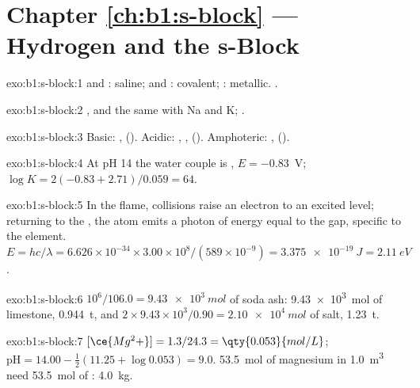 \section*{Chapter \ref{ch:b1:s-block} --- Hydrogen and the s-Block}

\begin{solution}{exo:b1:s-block:1}
 and : saline;  and : covalent;
: metallic. .
\end{solution}

\begin{solution}{exo:b1:s-block:2}
, and the same with Na and K;
.
\end{solution}

\begin{solution}{exo:b1:s-block:3}
Basic: ,  (). Acidic:
, ,  (). Amphoteric:
,  ().
\end{solution}

\begin{solution}{exo:b1:s-block:4}
At pH 14 the water couple is , $E = -0.83$~V;
$\log K = 2(-0.83 + 2.71)/0.059 = 64$.
\end{solution}

\begin{solution}{exo:b1:s-block:5}
In the flame, collisions raise an electron to an excited level; returning
to the , the atom emits a photon of energy equal to the gap,
specific to the element. $E = hc/\lambda = 6.626 \times 10^{-34} \times
3.00 \times 10^8/(589 \times 10^{-9}) = \qty{3.375e-19}{J} = \qty{2.11}{eV}$.
\end{solution}

\begin{solution}{exo:b1:s-block:6}
$10^6/106.0 = \qty{9.43e3}{mol}$ of soda ash: \qty{9.43e3}{mol} of
limestone, \qty{0.944}{t}, and $2 \times 9.43 \times 10^3/0.90 =
\qty{2.10e4}{mol}$ of salt, \qty{1.23}{t}.
\end{solution}

\begin{solution}{exo:b1:s-block:7}
$[\ce{Mg^2+}] = 1.3/24.3 = \qty{0.053}{mol/L}$; $\mathrm{pH} = 14.00 -
\frac12(11.25 + \log 0.053) = 9.0$. \qty{53.5}{mol} of magnesium in
\qty{1.0}{m^3} need \qty{53.5}{mol} of : \qty{4.0}{kg}.
\end{solution}

